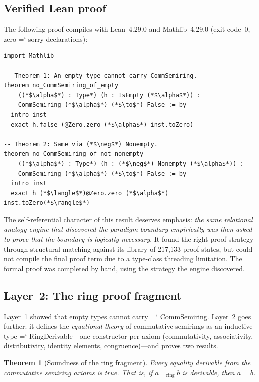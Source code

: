 \documentclass[11pt]{article}
\renewcommand{\texttt}[1]{%
  \begingroup\ttfamily\hyphenchar\font=`\-\relax
  \def\_{\textunderscore\discretionary{}{}{}}%
  #1\endgroup}
\newtheorem{theorem}{Theorem}
\theoremstyle{definition}
\theoremstyle{remark}
\begin{document}
\subsection{Verified Lean proof}

The following proof compiles with Lean~4.29.0 and Mathlib~4.29.0
(exit code~0, zero \texttt{sorry} declarations):

\begin{lstlisting}
import Mathlib

-- Theorem 1: An empty type cannot carry CommSemiring.
theorem no_CommSemiring_of_empty
    ((*$\alpha$*) : Type*) (h : IsEmpty (*$\alpha$*)) :
    CommSemiring (*$\alpha$*) (*$\to$*) False := by
  intro inst
  exact h.false (@Zero.zero (*$\alpha$*) inst.toZero)

-- Theorem 2: Same via (*$\neg$*) Nonempty.
theorem no_CommSemiring_of_not_nonempty
    ((*$\alpha$*) : Type*) (h : (*$\neg$*) Nonempty (*$\alpha$*)) :
    CommSemiring (*$\alpha$*) (*$\to$*) False := by
  intro inst
  exact h (*$\langle$*)@Zero.zero (*$\alpha$*) inst.toZero(*$\rangle$*)
\end{lstlisting}

\noindent The self-referential character of this result deserves
emphasis: \emph{the same relational analogy engine that discovered
the paradigm boundary empirically was then asked to prove that the
boundary is logically necessary}.  It found the right proof strategy
through structural matching against its library of 217{,}133 proof
states, but could not compile the final proof term due to a
type-class threading limitation.  The formal proof was completed by
hand, using the strategy the engine discovered.

\subsection{Layer~2: The ring proof fragment}

Layer~1 showed that empty types cannot carry \texttt{CommSemiring}.
Layer~2 goes further: it defines the \emph{equational theory} of
commutative semirings as an inductive type
\texttt{RingDerivable}---one constructor per axiom (commutativity,
associativity, distributivity, identity elements, congruence)---and
proves two results.

\begin{theorem}[Soundness of the ring fragment]%
\label{thm:ring_sound}
Every equality derivable from the commutative semiring axioms is
true.  That is, if $a =_{\mathrm{ring}} b$ is derivable, then
$a = b$.
\end{theorem}
\end{document}
